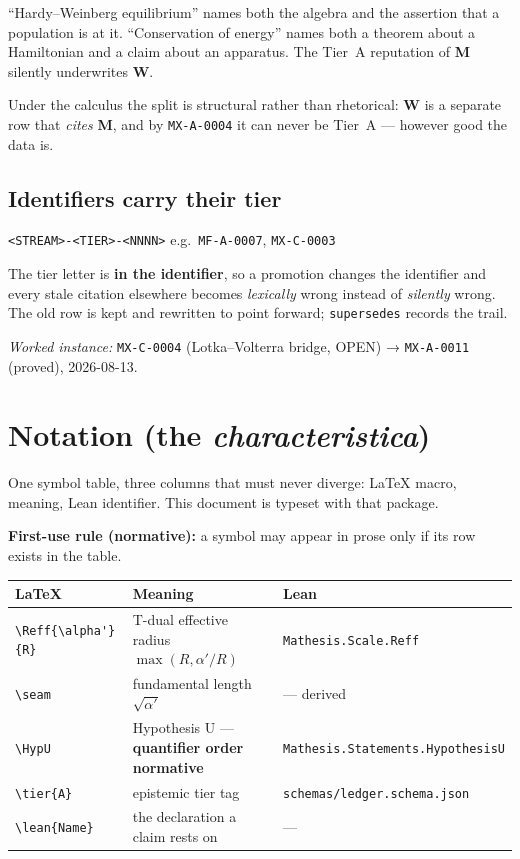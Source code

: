 \documentclass[11pt,a4paper]{article}
\begin{document}
``Hardy–Weinberg equilibrium'' names both the algebra and the assertion that a population is at
it. ``Conservation of energy'' names both a theorem about a Hamiltonian and a claim about an
apparatus. The Tier~A reputation of \textbf{M} silently underwrites \textbf{W}.

Under the calculus the split is structural rather than rhetorical: \textbf{W} is a separate row
that \emph{cites} \textbf{M}, and by \texttt{MX-A-0004} it can never be Tier~A — however good the
data is.

\subsection{Identifiers carry their tier}

\begin{center}
\texttt{<STREAM>-<TIER>-<NNNN>} \qquad e.g.\ \texttt{MF-A-0007}, \texttt{MX-C-0003}
\end{center}

The tier letter is \textbf{in the identifier}, so a promotion changes the identifier and every
stale citation elsewhere becomes \emph{lexically} wrong instead of \emph{silently} wrong. The old
row is kept and rewritten to point forward; \texttt{supersedes} records the trail.

\emph{Worked instance:} \texttt{MX-C-0004} (Lotka–Volterra bridge, OPEN) → \texttt{MX-A-0011}
(proved), 2026-08-13.

\section{Notation (the \emph{characteristica})}

One symbol table, three columns that must never diverge: LaTeX macro, meaning, Lean identifier.
This document is typeset with that package.

\textbf{First-use rule (normative):} a symbol may appear in prose only if its row exists in the
table.

\begin{center}\small
\begin{tabular}{@{}lll@{}}
\toprule
LaTeX & Meaning & Lean \\
\midrule
\verb|\Reff{\alpha'}{R}| & T-dual effective radius $\max(R,\alpha'/R)$ & \texttt{Mathesis.Scale.Reff} \\
\verb|\seam|             & fundamental length $\sqrt{\alpha'}$          & — derived \\
\verb|\HypU|             & Hypothesis U — \textbf{quantifier order normative} & \texttt{Mathesis.Statements.HypothesisU} \\
\verb|\tier{A}|          & epistemic tier tag                            & \texttt{schemas/ledger.schema.json} \\
\verb|\lean{Name}|       & the declaration a claim rests on              & — \\
\bottomrule
\end{tabular}
\end{center}
\end{document}
